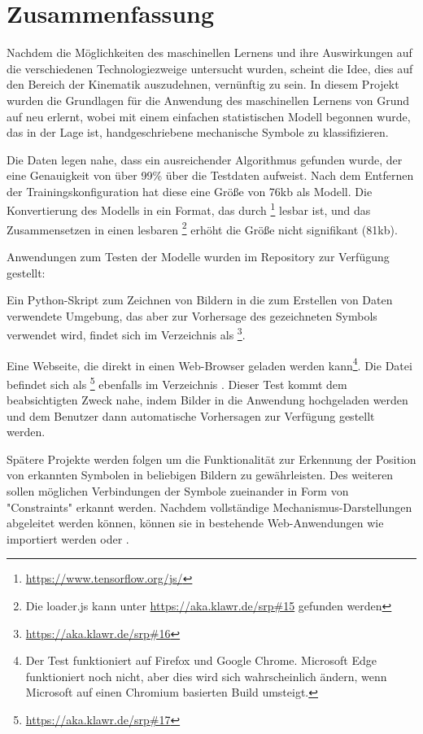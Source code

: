 \section{Zusammenfassung}

Nachdem die Möglichkeiten des maschinellen Lernens und ihre Auswirkungen auf die verschiedenen Technologiezweige untersucht wurden, scheint die Idee, dies auf den Bereich der Kinematik auszudehnen, vernünftig zu sein.
In diesem Projekt wurden die Grundlagen für die Anwendung des maschinellen Lernens von Grund auf neu erlernt, wobei mit einem einfachen statistischen Modell begonnen wurde, das in der Lage ist, handgeschriebene mechanische Symbole zu klassifizieren.

Die Daten legen nahe, dass ein ausreichender Algorithmus gefunden wurde, der eine Genauigkeit von über 99\% über die Testdaten aufweist.
Nach dem Entfernen der Trainingskonfiguration hat diese eine Größe von 76kb als  Modell.
Die Konvertierung des Modells in ein Format, das durch \footnote{\url{https://www.tensorflow.org/js/}} lesbar ist, und das Zusammensetzen in einen lesbaren \footnote{Die loader.js kann unter \url{https://aka.klawr.de/srp\#15} gefunden werden} erhöht die Größe nicht signifikant (81kb).

Anwendungen zum Testen der Modelle wurden im Repository zur Verfügung gestellt:

Ein Python-Skript zum Zeichnen von Bildern in die zum Erstellen von Daten verwendete Umgebung, das aber zur Vorhersage des gezeichneten Symbols verwendet wird, findet sich im Verzeichnis  als \footnote{\url{https://aka.klawr.de/srp\#16}}.

Eine Webseite, die direkt in einen Web-Browser geladen werden kann\footnote{Der Test funktioniert auf Firefox und Google Chrome. Microsoft Edge funktioniert noch nicht, aber dies wird sich wahrscheinlich ändern, wenn Microsoft auf einen Chromium basierten Build umsteigt. }.
Die Datei befindet sich als \footnote{\url{https://aka.klawr.de/srp\#17}} ebenfalls im Verzeichnis .
Dieser Test kommt dem beabsichtigten Zweck nahe, indem Bilder in die Anwendung hochgeladen werden und dem Benutzer dann automatische Vorhersagen zur Verfügung gestellt werden.

Spätere Projekte werden folgen um die Funktionalität zur Erkennung der Position von erkannten Symbolen in beliebigen Bildern zu gewährleisten.
Des weiteren sollen möglichen Verbindungen der Symbole zueinander in Form von "Constraints" erkannt werden.
Nachdem vollständige Mechanismus-Darstellungen abgeleitet werden können, können sie in bestehende Web-Anwendungen wie  importiert werden \cite{Goessner2019, Goessner2019a, Goessner2019b} oder  \cite{Uhlig2019, Uhlig2019a}.
